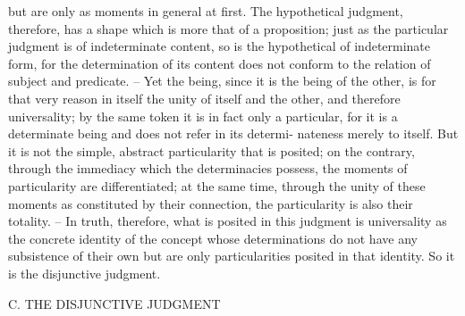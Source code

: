 but are only as moments in general at first. The hypothetical judgment,
therefore, has a shape which is more that of a proposition; just as the
particular judgment is of indeterminate content, so is the hypothetical of
indeterminate form, for the determination of its content does not conform
to the relation of subject and predicate. – Yet the being, since it is the
being of the other, is for that very reason in itself the unity of itself and
the other, and therefore universality; by the same token it is in fact only a
particular, for it is a determinate being and does not refer in its determi-
nateness merely to itself. But it is not the simple, abstract particularity that
is posited; on the contrary, through the immediacy which the determinacies
possess, the moments of particularity are differentiated; at the same time,
through the unity of these moments as constituted by their connection,
the particularity is also their totality. – In truth, therefore, what is posited
in this judgment is universality as the concrete identity of the concept
whose determinations do not have any subsistence of their own but are
only particularities posited in that identity. So it is the disjunctive judgment.

C. THE DISJUNCTIVE JUDGMENT

